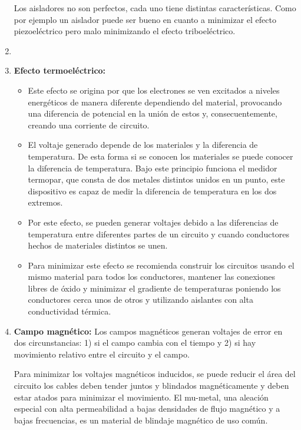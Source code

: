 \begin{enumerate}
     Los aisladores no son  perfectos, cada uno tiene distintas características. Como por ejemplo un aislador puede ser bueno en cuanto a minimizar el efecto piezoeléctrico pero malo minimizando el efecto triboeléctrico.
     
     \item %
    
    \item %
    \textbf{Efecto termoeléctrico:}
    \begin{itemize}
        \item Este efecto se origina por que los electrones se ven excitados a niveles energéticos de manera diferente dependiendo del material, provocando una diferencia de potencial en la unión de estos y, consecuentemente, creando una corriente de circuito.
        \item El voltaje generado depende de los materiales y la diferencia de temperatura. De esta forma si se conocen los materiales se puede conocer la diferencia de temperatura. Bajo este principio funciona el medidor termopar, que consta de dos metales distintos unidos en un punto, este dispositivo es capaz de medir la diferencia de temperatura en los dos extremos.
        \item Por este efecto, se pueden generar voltajes debido a las diferencias de temperatura entre diferentes partes de un circuito y cuando conductores hechos de materiales distintos se unen.
        \item Para minimizar este efecto se recomienda construir los circuitos usando el mismo material para todos los conductores, mantener las conexiones libres de óxido y minimizar el gradiente de temperaturas poniendo los conductores cerca unos de otros y utilizando aislantes con alta conductividad térmica.
    \end{itemize}

    
    \item %
    \textbf{Campo magnético:} Los campos magnéticos generan voltajes de error en dos circunstancias: 1) si el campo cambia con el tiempo y 2) si hay movimiento relativo entre el circuito y el campo.
    
    Para minimizar los voltajes magnéticos inducidos, se puede reducir el área del circuito los cables deben tender juntos y blindados magnéticamente y deben estar atados para minimizar el movimiento. El mu-metal, una aleación especial con alta permeabilidad a bajas densidades de flujo magnético y a bajas frecuencias, es un material de blindaje magnético de uso común.


\end{enumerate}
